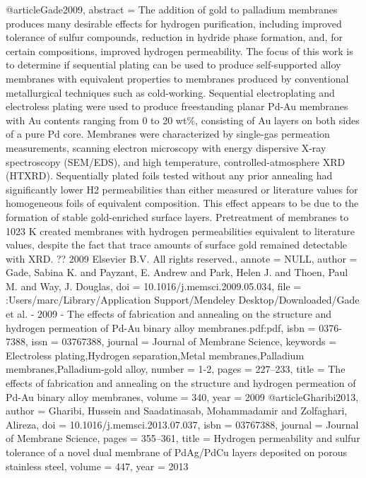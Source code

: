 @article{Gade2009,
abstract = {The addition of gold to palladium membranes produces many desirable effects for hydrogen purification, including improved tolerance of sulfur compounds, reduction in hydride phase formation, and, for certain compositions, improved hydrogen permeability. The focus of this work is to determine if sequential plating can be used to produce self-supported alloy membranes with equivalent properties to membranes produced by conventional metallurgical techniques such as cold-working. Sequential electroplating and electroless plating were used to produce freestanding planar Pd-Au membranes with Au contents ranging from 0 to 20 wt{\%}, consisting of Au layers on both sides of a pure Pd core. Membranes were characterized by single-gas permeation measurements, scanning electron microscopy with energy dispersive X-ray spectroscopy (SEM/EDS), and high temperature, controlled-atmosphere XRD (HTXRD). Sequentially plated foils tested without any prior annealing had significantly lower H2 permeabilities than either measured or literature values for homogeneous foils of equivalent composition. This effect appears to be due to the formation of stable gold-enriched surface layers. Pretreatment of membranes to 1023 K created membranes with hydrogen permeabilities equivalent to literature values, despite the fact that trace amounts of surface gold remained detectable with XRD. ?? 2009 Elsevier B.V. All rights reserved.},
annote = {NULL},
author = {Gade, Sabina K. and Payzant, E. Andrew and Park, Helen J. and Thoen, Paul M. and Way, J. Douglas},
doi = {10.1016/j.memsci.2009.05.034},
file = {:Users/marc/Library/Application Support/Mendeley Desktop/Downloaded/Gade et al. - 2009 - The effects of fabrication and annealing on the structure and hydrogen permeation of Pd-Au binary alloy membranes.pdf:pdf},
isbn = {0376-7388},
issn = {03767388},
journal = {Journal of Membrane Science},
keywords = {Electroless plating,Hydrogen separation,Metal membranes,Palladium membranes,Palladium-gold alloy},
number = {1-2},
pages = {227--233},
title = {{The effects of fabrication and annealing on the structure and hydrogen permeation of Pd-Au binary alloy membranes}},
volume = {340},
year = {2009}
}
@article{Gharibi2013,
author = {Gharibi, Hussein and Saadatinasab, Mohammadamir and Zolfaghari, Alireza},
doi = {10.1016/j.memsci.2013.07.037},
isbn = {03767388},
journal = {Journal of Membrane Science},
pages = {355--361},
title = {{Hydrogen permeability and sulfur tolerance of a novel dual membrane of PdAg/PdCu layers deposited on porous stainless steel}},
volume = {447},
year = {2013}
}
